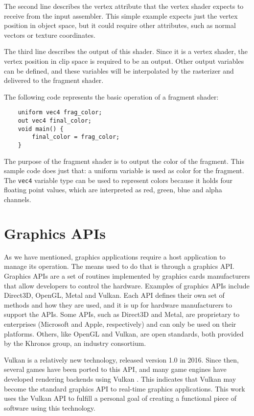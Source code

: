 The second line describes the vertex attribute that the vertex shader expects to receive from the input assembler. This simple example expects just the vertex position in object space, but it could require other attributes, such as normal vectors or texture coordinates.

The third line describes the output of this shader. Since it is a vertex shader, the vertex position in clip space is required to be an output. Other output variables can be defined, and these variables will be interpolated by the rasterizer and delivered to the fragment shader.

The following code represents the basic operation of a fragment shader:

\begin{verbatim}
    uniform vec4 frag_color;
    out vec4 final_color;
    void main() {
        final_color = frag_color;
    }
\end{verbatim}

The purpose of the fragment shader is to output the color of the fragment. This sample code does just that: a uniform variable is used as color for the fragment. The \texttt{vec4} variable type can be used to represent colors because it holds four floating point values, which are interpreted as red, green, blue and alpha channels.

\section{Graphics APIs}
As we have mentioned, graphics applications require a host application to manage its operation. The means used to do that is through a graphics API. Graphics APIs are a set of routines implemented by graphics cards manufacturers that allow developers to control the hardware. Examples of graphics APIs include Direct3D, OpenGL, Metal and Vulkan. Each API defines their own set of methods and how they are used, and it is up for hardware manufacturers to support the APIs. Some APIs, such as Direct3D and Metal, are proprietary to enterprises (Microsoft and Apple, respectively) and can only be used on their platforms. Others, like OpenGL and Vulkan, are open standards, both provided by the Khronos group, an industry consortium.

Vulkan is a relatively new technology, released version 1.0 in 2016. Since then, several games have been ported to this API, and many game engines have developed rendering backends using Vulkan \cite{vulkan}. This indicates that Vulkan may become the standard graphics API to real-time graphics applications. This work uses the Vulkan API to fulfill a personal goal of creating a functional piece of software using this technology.



%
%
